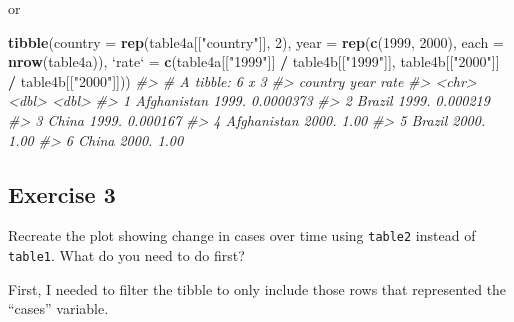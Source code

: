 \documentclass[]{book}
\newenvironment{Shaded}{\begin{snugshade}}{\end{snugshade}}
\newcommand{\CommentTok}[1]{\textcolor[rgb]{0.56,0.35,0.01}{\textit{#1}}}
\newcommand{\DataTypeTok}[1]{\textcolor[rgb]{0.13,0.29,0.53}{#1}}
\newcommand{\DecValTok}[1]{\textcolor[rgb]{0.00,0.00,0.81}{#1}}
\newcommand{\KeywordTok}[1]{\textcolor[rgb]{0.13,0.29,0.53}{\textbf{#1}}}
\newcommand{\NormalTok}[1]{#1}
\newcommand{\OperatorTok}[1]{\textcolor[rgb]{0.81,0.36,0.00}{\textbf{#1}}}
\newcommand{\StringTok}[1]{\textcolor[rgb]{0.31,0.60,0.02}{#1}}
\theoremstyle{definition}
\theoremstyle{definition}
\theoremstyle{definition}
\theoremstyle{remark}
\begin{document}
or

\begin{Shaded}
\begin{Highlighting}[]
\KeywordTok{tibble}\NormalTok{(}\DataTypeTok{country =} \KeywordTok{rep}\NormalTok{(table4a[[}\StringTok{"country"}\NormalTok{]], }\DecValTok{2}\NormalTok{),}
       \DataTypeTok{year =} \KeywordTok{rep}\NormalTok{(}\KeywordTok{c}\NormalTok{(}\DecValTok{1999}\NormalTok{, }\DecValTok{2000}\NormalTok{), }\DataTypeTok{each =} \KeywordTok{nrow}\NormalTok{(table4a)),}
       \StringTok{`}\DataTypeTok{rate}\StringTok{`}\NormalTok{ =}\StringTok{ }\KeywordTok{c}\NormalTok{(table4a[[}\StringTok{"1999"}\NormalTok{]] }\OperatorTok{/}\StringTok{ }\NormalTok{table4b[[}\StringTok{"1999"}\NormalTok{]],}
\NormalTok{                  table4b[[}\StringTok{"2000"}\NormalTok{]] }\OperatorTok{/}\StringTok{ }\NormalTok{table4b[[}\StringTok{"2000"}\NormalTok{]]))}
\CommentTok{#> # A tibble: 6 x 3}
\CommentTok{#>   country      year      rate}
\CommentTok{#>   <chr>       <dbl>     <dbl>}
\CommentTok{#> 1 Afghanistan 1999. 0.0000373}
\CommentTok{#> 2 Brazil      1999. 0.000219 }
\CommentTok{#> 3 China       1999. 0.000167 }
\CommentTok{#> 4 Afghanistan 2000. 1.00     }
\CommentTok{#> 5 Brazil      2000. 1.00     }
\CommentTok{#> 6 China       2000. 1.00}
\end{Highlighting}
\end{Shaded}

\hypertarget{exercise-3-13}{%
\subsection{Exercise 3}\label{exercise-3-13}}

Recreate the plot showing change in cases over time using
\texttt{table2} instead of \texttt{table1}. What do you need to do
first?

First, I needed to filter the tibble to only include those rows that
represented the ``cases'' variable.

\begin{Shaded}
\end{Shaded}
\end{document}
